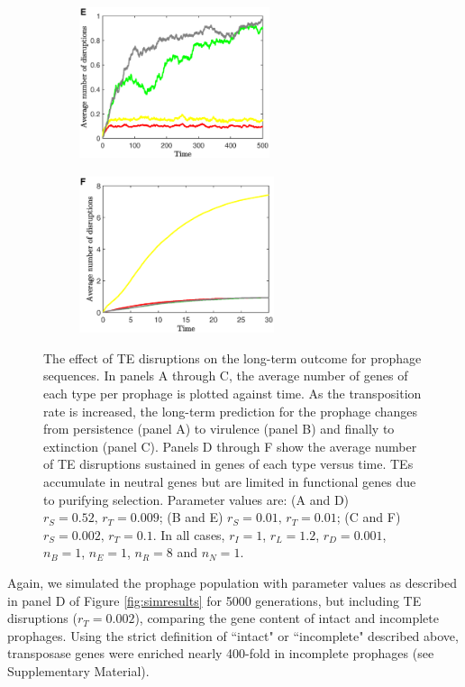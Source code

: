 \begin{figure}[H]
\begin{subfigure}[t]{0.30\textwidth}
     \end{subfigure}\hfill
         \begin{subfigure}[t]{0.30\textwidth}
    \includegraphics[height=1.8in,width=2.2in]{persisISE}
    \end{subfigure}\hfill
    \begin{subfigure}[t]{0.30\textwidth}
        \includegraphics[height=1.8in,width=2.25in]{persisISF}
    \end{subfigure}\hfill  
     \caption[The effect of TE disruptions on the long-term outcome for prophage sequences]{The effect of TE disruptions on the long-term outcome for prophage sequences. In panels A through C, the average number of genes of each type per prophage is plotted against time.  As the transposition rate is increased, the long-term prediction for the prophage changes from persistence (panel A) to virulence (panel B) and finally to extinction (panel C).  Panels D through F show the average number of TE disruptions sustained in genes of each type versus time.  TEs accumulate in neutral genes but are limited in functional genes due to purifying selection.  Parameter values are:
     (A and D)  $r_S = 0.52, \, r_T = 0.009$;  (B and E) $r_S = 0.01, \, r_T = 0.01$; (C and F) $r_S = 0.002, \, r_T = 0.1$. In all cases, $r_I=1$, $r_L = 1.2$, $r_D = 0.001$, $n_B=1$, $n_E=1$, $n_R=8$ and $n_N=1$.}
     \label{fig:TEsresults}
     \end{figure}

Again, we simulated the prophage population with parameter values as described in panel D of Figure \ref{fig:simresults} for 5000 generations, but including TE disruptions ($r_T = 0.002$), comparing the gene content of intact and incomplete prophages.  Using the strict definition of ``intact"  or ``incomplete" described above, transposase genes were enriched nearly 400-fold in incomplete prophages (see Supplementary Material).  

